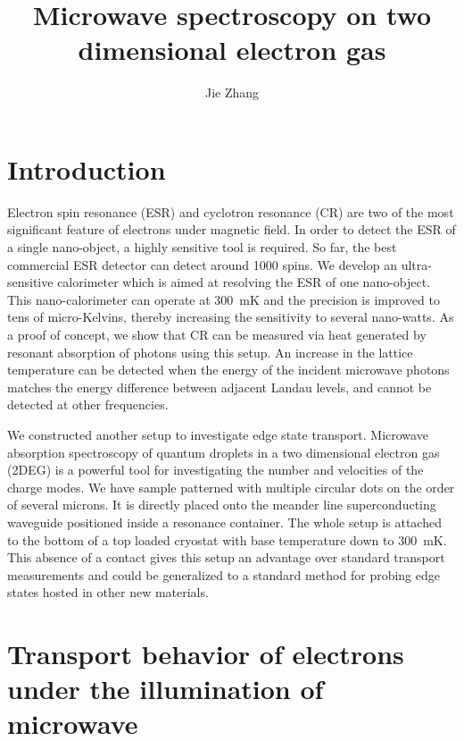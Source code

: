 \documentclass[12pt]{ruthesis}
\title{Microwave spectroscopy on two dimensional electron gas}
\author{Jie Zhang}
\begin{document}
  \begin{frontmatter}
   \maketitle



%
\tableofcontents
\listoffigures
%   
\end{frontmatter}

\chapter{Introduction}

Electron spin resonance (ESR) and cyclotron resonance (CR) are two of the most significant feature of electrons under magnetic field.
In order to detect the ESR of a single nano-object, a highly sensitive tool is required.
So far, the best commercial ESR detector can detect around 1000 spins.
We develop an ultra-sensitive calorimeter which is aimed at resolving the ESR of one nano-object.
This nano-calorimeter can operate at \SI{300}{\milli\kelvin} and the precision is improved to tens of micro-Kelvins, thereby increasing the sensitivity to several nano-watts.
As a proof of concept, we show that CR can be measured via heat generated by resonant absorption of photons using this setup.
An increase in the lattice temperature can be detected when the energy of the incident microwave photons matches the energy difference between adjacent Landau levels, and cannot be detected at other frequencies.

We constructed another setup to investigate edge state transport.
Microwave absorption spectroscopy of quantum droplets in a two dimensional electron gas (2DEG) is a powerful tool for investigating the number and velocities of the charge modes.
We have sample patterned with multiple circular dots on the order of several microns.
It is directly placed onto the meander line superconducting waveguide positioned inside a resonance container.
The whole setup is attached to the bottom of a top loaded  cryostat with base temperature down to \SI{300}{\milli\kelvin}.
This absence of a contact gives this setup an advantage over standard transport measurements and could be generalized to a standard method for probing edge states hosted in other new materials.


\chapter{Transport behavior of electrons under the illumination of microwave}\label{Transport}
\end{document}
